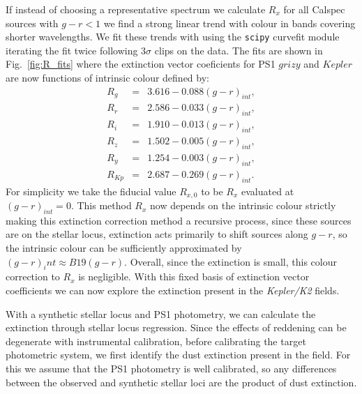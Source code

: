 \documentclass{aastex63}
\begin{document}

If instead of choosing a representative spectrum we calculate $R_x$ for all Calspec sources with $g-r < 1$ we find a strong linear trend with colour in bands covering shorter wavelengths. We fit these trends with using the \texttt{scipy} curvefit module iterating the fit twice following $3\sigma$ clips on the data. The fits are shown in Fig.~\ref{fig:R_fits} where the extinction vector coeficients for PS1 $grizy$ and $Kepler$ are now functions of intrinsic colour defined by:
\begin{eqnarray} 
R_g&=&3.616-0.088(g-r)_{int},\label{eqn:vectors}\\
R_r&=&2.586-0.033(g-r)_{int},\nonumber \\
R_i&=&1.910-0.013(g-r)_{int},\nonumber\\
R_z&=&1.502-0.005(g-r)_{int},\nonumber\\
R_y&=&1.254-0.003(g-r)_{int},\nonumber\\
R_{Kp}&=&2.687-0.269(g-r)_{int}.\nonumber
\end{eqnarray}
For simplicity we take the fiducial value $R_{x,0}$ to be $R_x$ evaluated at $(g-r)_{int}=0$. This method  $R_x$ now depends on the intrinsic colour strictly making this extinction correction method a recursive process, since these sources are on the stellar locus, extinction acts primarily to shift sources along $g-r$, so the intrinsic colour can be sufficiently approximated by $(g-r)_int\approx B19(g-r)$. Overall, since the extinction is small, this colour correction to $R_x$ is negligible. With this fixed basis of extinction vector coefficients we can now explore the extinction present in the \textit{Kepler/K2} fields.




With a synthetic stellar locus and PS1 photometry, we can calculate the extinction through stellar locus regression. Since the effects of reddening can be degenerate with instrumental calibration, before calibrating the target photometric system, we first identify the dust extinction present in the field. For this we assume that the PS1 photometry is well calibrated, so any differences between the observed and synthetic stellar loci are the product of dust extinction. 
\end{document}
